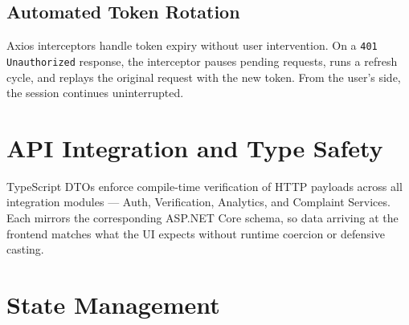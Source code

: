 \subsection{Automated Token Rotation}
Axios interceptors handle token expiry without user intervention. On a \texttt{401 Unauthorized} response, the interceptor pauses pending requests, runs a refresh cycle, and replays the original request with the new token. From the user's side, the session continues uninterrupted.


\section{API Integration and Type Safety}
\label{sec:api-integration}

TypeScript DTOs enforce compile-time verification of HTTP payloads across all integration modules --- Auth, Verification, Analytics, and Complaint Services. Each mirrors the corresponding ASP.NET Core schema, so data arriving at the frontend matches what the UI expects without runtime coercion or defensive casting.

\section{State Management}
\label{sec:state-management}

